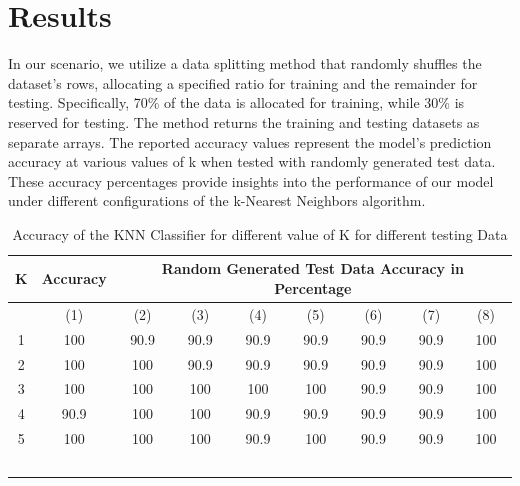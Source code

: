 \documentclass[conference]{IEEEtran}
\begin{document}
\section{Results}
In our scenario, we utilize a data splitting method that randomly shuffles the dataset's rows, allocating a specified ratio for training and the remainder for testing. Specifically, 70\% of the data is allocated for training, while 30\% is reserved for testing. The method returns the training and testing datasets as separate arrays. 
The reported accuracy values represent the model's prediction accuracy at various values of k when tested with randomly generated test data. These accuracy percentages provide insights into the performance of our model under different configurations of the k-Nearest Neighbors algorithm.


\begin{table}
    \centering
    \begin{tabular}{|c|c|c|c|c|c|c|c|c|}
    \hline
       
        K  & Accuracy & \multicolumn{7}{c}{Random Generated Test Data Accuracy in Percentage}\\
           \hline
          & (1) & (2) & (3) & (4) & (5) & (6) & (7) & (8)\\
                     \hline
        1 & 100 & 90.9 & 90.9  & 90.9 & 90.9 & 90.9 & 90.9 & 100\\
            \hline
        2 & 100 & 100 & 90.9 & 90.9 & 90.9 & 90.9 & 90.9 & 100\\
            \hline
        3 & 100 & 100 & 100 & 100 & 100 & 90.9 & 90.9 & 100\\
            \hline
        4 & 90.9 & 100 & 100 & 90.9 & 90.9 & 90.9 & 90.9 & 100\\
            \hline
        5 & 100 & 100 & 100 & 90.9 & 100 & 90.9 & 90.9 & 100\\
             \hline
             \
    \end{tabular}
    
    \caption{Accuracy of the KNN Classifier for different value of K for different testing Data}
    \label{tab:my_label}
\end{table}
\end{document}
